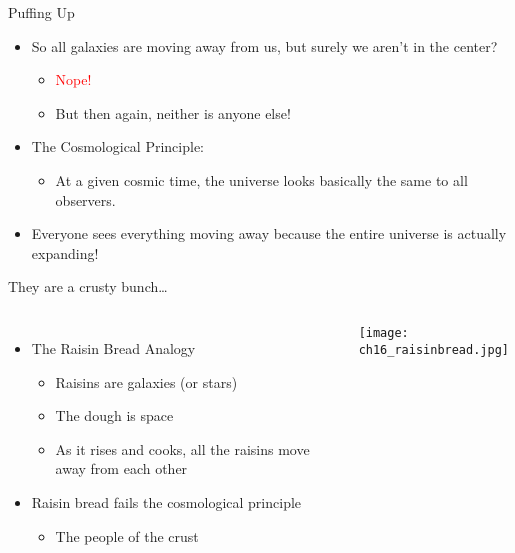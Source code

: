 \documentclass[pdf, aspectratio=169]{beamer}
\begin{document}
\begin{frame}{Puffing Up}
  \begin{itemize}
	\item So all galaxies are moving away from us, but surely we aren't in the center?
	  \begin{itemize}
		\item \textcolor{Red}{Nope!}
		\item But then again, neither is anyone else!
	  \end{itemize}
	\item The Cosmological Principle:
	  \begin{itemize}
		\item At a given cosmic time, the universe looks basically the same to all observers.
	  \end{itemize}
	\item Everyone sees everything moving away because the entire universe is actually expanding!
  \end{itemize}
\end{frame}

\begin{frame}{They are a crusty bunch\ldots}
  \begin{columns}
	\begin{itemize}
	  \item The Raisin Bread Analogy
		\begin{itemize}
		  \item Raisins are galaxies (or stars)
		  \item The dough is space
		  \item As it rises and cooks, all the raisins move away from each other
		\end{itemize}
	  \item Raisin bread fails the cosmological principle
		\begin{itemize}
		  \item The people of the crust
		\end{itemize}
	\end{itemize}
	\begin{center}
	  \texttt{[image: ch16\_raisinbread.jpg]}
	\end{center}
  \end{columns}
\end{frame}
\end{document}
